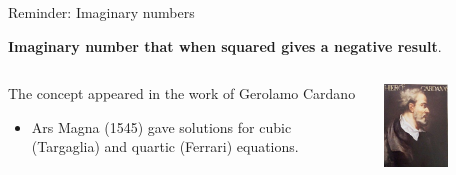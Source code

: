 
%
%

{
\reminderslide

%
%
%

\begin{frame}{Reminder: Imaginary numbers}

\begin{center}
{\bf Imaginary number that when squared gives a negative result}.\\
\end{center}

\vspace{0.2cm}

\begin{columns}
  \begin{column}{0.75\textwidth}
   {\small
      The concept appeared in the work of Gerolamo Cardano\\
      \begin{itemize}
        \item Ars Magna (1545) gave solutions for cubic (Targaglia)
              and quartic (Ferrari) equations.
      \end{itemize}
   }
  \end{column}
  \begin{column}{0.25\textwidth}
    \begin{center}
      \includegraphics[width=0.50\textwidth]{./images/people/cardano.jpg}
    \end{center}
  \end{column}
\end{columns}



\end{frame}}
